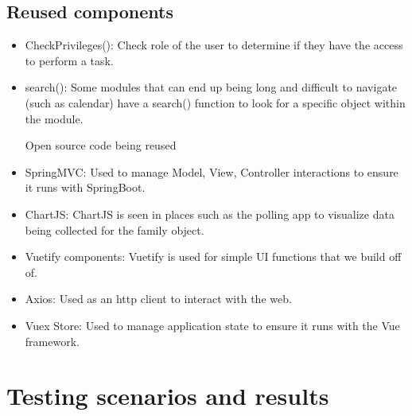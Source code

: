 \documentclass[12pt]{article}
\begin{document}
\subsection{Reused components}

\begin{itemize}
\subsection{Methods being reused}
    \item CheckPrivileges(): Check role of the user to determine if they have the access to perform a task.
    \item search(): Some modules that can end up being long and difficult to navigate (such as calendar) have a search() function to look for a specific object within the module. 
    
\begin{flushleft} \large
Open source code being reused
\end{flushleft}
    \item SpringMVC: Used to manage Model, View, Controller interactions to ensure it runs with SpringBoot. 
    \item ChartJS: ChartJS is seen in places such as the polling app to visualize data being collected for the family object. 
    \item Vuetify components: Vuetify is used for simple UI functions that we build off of. 
    \item Axios: Used as an http client to interact with the web. 
    \item Vuex Store: Used to manage application state to ensure it runs with the Vue framework. 
\end{itemize}

\section{Testing scenarios and results}
\end{document}
